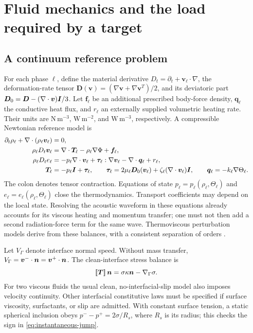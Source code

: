 \section{Fluid mechanics and the load required by a target}\label{sec:mechanics}

\subsection{A continuum reference problem}
For each phase $\ell$, define the material derivative
$D_t=\partial_t+\bm v_\ell\cdot\nabla$, the deformation-rate tensor
$\bm D(\bm v)=(\nabla\bm v+\nabla\bm v^T)/2$, and its deviatoric part
$\bm D_0=\bm D-(\nabla\cdot\bm v)\bm I/3$. Let $\bm f_\ell$ be an additional
prescribed body-force density, $\bm q_\ell$ the conductive heat flux, and
$r_\ell$ an externally supplied volumetric heating rate. Their units are
$\mathrm{N\,m^{-3}}$, $\mathrm{W\,m^{-2}}$, and $\mathrm{W\,m^{-3}}$,
respectively. A compressible Newtonian reference model is
\begin{align}
 \partial_t\rho_\ell+\nabla\cdot(\rho_\ell\bm v_\ell)&=0,
 \label{eq:mass}\\
 \rho_\ell D_t\bm v_\ell
 &=\nabla\cdot\bm T_\ell-\rho_\ell\nabla\Phi+\bm f_\ell,
 \label{eq:momentum}\\
 \rho_\ell D_te_\ell
 &=-p_\ell\nabla\cdot\bm v_\ell
   +\bm\tau_\ell:\nabla\bm v_\ell-\nabla\cdot\bm q_\ell+r_\ell,
 \label{eq:internal-energy}\\
 \bm T_\ell&=-p_\ell\bm I+\bm\tau_\ell,\qquad
 \bm\tau_\ell=2\mu_\ell\bm D_0(\bm v_\ell)
                +\zeta_\ell(\nabla\cdot\bm v_\ell)\bm I,
 \qquad \bm q_\ell=-k_\ell\nabla\Theta_\ell.
 \label{eq:constitutive}
\end{align}
The colon denotes tensor contraction. Equations of state
$p_\ell=p_\ell(\rho_\ell,\Theta_\ell)$ and
$e_\ell=e_\ell(\rho_\ell,\Theta_\ell)$ close the thermodynamics. Transport
coefficients may depend on the local state. Resolving the acoustic waveform in
these equations already accounts for its viscous heating and momentum transfer;
one must not then add a second radiation-force term for the same wave.
Thermoviscous perturbation models derive from these balances, with a consistent
separation of orders \cite{jorgensen2021}.

Let $V_\Gamma$ denote interface normal speed. Without mass transfer,
$V_\Gamma=\bm v^-\cdot\bm n=\bm v^+\cdot\bm n$. The clean-interface stress balance
is
\begin{equation}
 \left[\!\left[\bm T\right]\!\right]\bm n=\sigma\kappa\bm n-\nabla_\Gamma\sigma.
 \label{eq:instantaneous-jump}
\end{equation}
For two viscous fluids the usual clean, no-interfacial-slip model also imposes
velocity continuity. Other interfacial constitutive laws must be specified if
surface viscosity, surfactants, or slip are admitted. With constant surface
tension, a static spherical inclusion obeys
$p^- -p^+=2\sigma/R_s$, where $R_s$ is its radius; this checks the sign in
\cref{eq:instantaneous-jump}.

